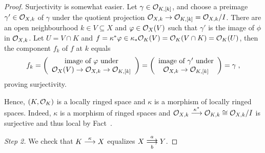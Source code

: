 \documentclass[a4paper,parskip=half,numbers=enddot, DIV=12]{scrreprt}
\begin{document}
\begin{proof}
	Surjectivity is somewhat easier. Let $\gamma\in\mathcal{O}_{K,[k]}$, and choose a preimage $\gamma'\in\mathcal{O}_{X,k}$ of $\gamma$ under the quotient projection $\Oo_{X,k}\morphism\Oo_{K,[k]}=\Oo_{X,k}/I$. There are an open neighbourhood $k\in V\subseteq X$ and $\varphi\in\mathcal{O}_X(V)$ such that $\gamma'$ is the image of $\phi$ in $\mathcal{O}_{X,k}$. Let $U=V\cap K$ and $f=\kappa^*\varphi\in\kappa_*\mathcal{O}_K(V)=\mathcal{O}_K(V\cap K)=\mathcal{O}_K(U)$, then the component $f_k$ of $f$ at $k$ equals
	\begin{align*}
		f_k=\left(
		\begin{array}{c}
			\text{image of }\phi\text{ under}\\
			\Oo_X(V)\morphism\Oo_{X,k}\morphism\Oo_{K,[k]}
		\end{array}\right)=\left(
		\begin{array}{c}
			\text{image of }\gamma'\text{ under}\\
			\Oo_{X,k}\morphism\Oo_{K,[k]}
		\end{array}\right)=\gamma\;,
	\end{align*}
	proving surjectivity.
	
	Hence, $(K,\mathcal{O}_K)$ is a locally ringed space and $\kappa$ is a morphism of locally ringed spaces. Indeed, $\kappa$ is a morphism of ringed spaces and $\Oo_{X,k}\morphism[\kappa^*]\Oo_{K,k}\cong\Oo_{X,k}/I$ is surjective and thus local by Fact~.
	
	\emph{Step 2.} We check that $K\morphism[\kappa]X$ equalizes $X\doublemorphism[a][\smash{b}]Y$.
	

\end{proof}
\end{document}
